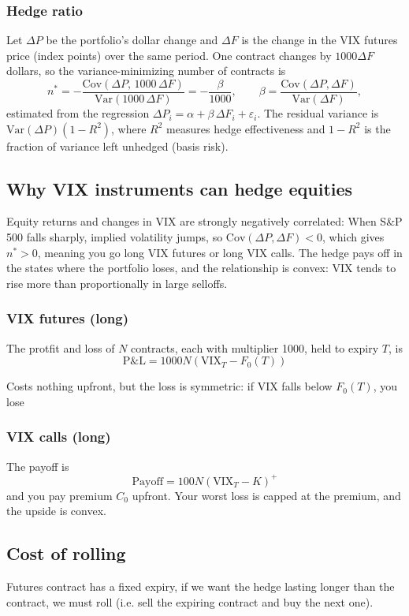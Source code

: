 \documentclass[12pt]{article}
\begin{document}
\subsubsection{Hedge ratio}
Let $\Delta P$ be the portfolio's dollar change and $\Delta F$ is the change in the VIX futures price (index points) over the same period. One contract changes by $1000 \Delta F$ dollars, so the variance-minimizing number of contracts is
\[
    n^* = -\frac{\mathrm{Cov}(\Delta P,\,1000\,\Delta F)}{\mathrm{Var}(1000\,\Delta F)}
        = -\frac{\beta}{1000},
    \qquad
    \beta = \frac{\mathrm{Cov}(\Delta P,\Delta F)}{\mathrm{Var}(\Delta F)},
\]
estimated from the regression $\Delta P_i = \alpha + \beta\,\Delta F_i + \varepsilon_i$.
The residual variance is $\mathrm{Var}(\Delta P)(1-R^2)$, where $R^2$ measures hedge
effectiveness and $1-R^2$ is the fraction of variance left unhedged (basis risk).

\subsection{Why VIX instruments can hedge equities}
Equity returns and changes in VIX are strongly negatively correlated: When S\&P 500 falls sharply, implied volatility jumps, so $\mathrm{Cov}(\Delta P, \Delta F) < 0$, which gives $n^* > 0$, meaning you go long VIX futures or long VIX calls. The hedge pays off in the states where the portfolio loses, and the relationship is convex: VIX tends to rise more than proportionally in large selloffs.

\subsubsection{VIX futures (long)}
The protfit and loss of $N$ contracts, each with multiplier 1000, held to expiry $T$, is
\[
    \mathrm{P\&L} = 1000 N (\mathrm{VIX}_T - F_0(T))
\]

Costs nothing upfront, but the loss is symmetric: if VIX falls below $F_0(T)$, you lose

\subsubsection{VIX calls (long)}
The payoff is
\[
    \mathrm{Payoff} = 100 N (\mathrm{VIX}_T - K)^+
\]
and you pay premium $C_0$ upfront. Your worst loss is capped at the premium, and the upside is convex.


\subsection{Cost of rolling}
Futures contract has a fixed expiry, if we want the hedge lasting longer than the contract, we must roll (i.e. sell the expiring contract and buy the next one).
\end{document}
